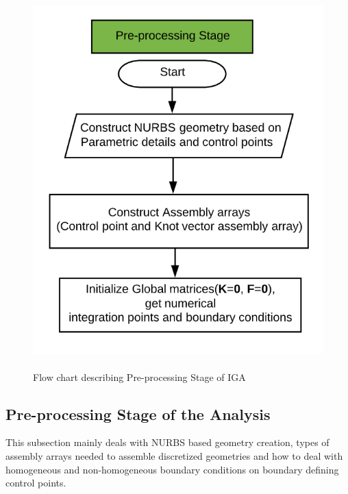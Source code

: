\documentclass[11pt]{article}
\begin{document}
\begin{figure}[H]
	\begin{center}
		\includegraphics[scale=0.4]{PreProcessing.png} 
		\caption{\\Flow chart describing Pre-processing Stage of IGA}\label{PreProcessing}
	\end{center}
	
\end{figure}
\subsection{Pre-processing Stage of the Analysis}
This subsection mainly deals with NURBS based geometry creation, types of assembly arrays needed to assemble discretized geometries and how to deal with homogeneous and non-homogeneous boundary conditions on boundary defining control points.
\end{document}
